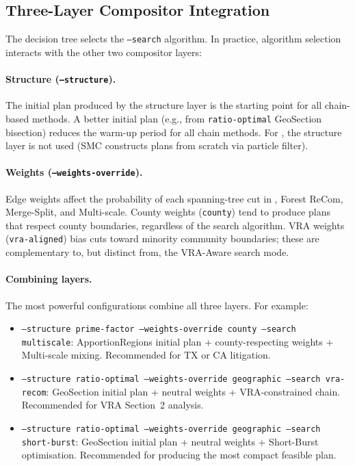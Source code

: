 \subsection{Three-Layer Compositor Integration}

The decision tree selects the \texttt{--search} algorithm.
In practice, algorithm selection interacts with the other two compositor
layers:

\paragraph{Structure (\texttt{--structure}).}
The initial plan produced by the structure layer is the starting point for
all chain-based methods.
A better initial plan (e.g., from \texttt{ratio-optimal} GeoSection
bisection) reduces the warm-up period for all chain methods.
For \smc{}, the structure layer is not used (SMC constructs plans from
scratch via particle filter).

\paragraph{Weights (\texttt{--weights-override}).}
Edge weights affect the probability of each spanning-tree cut in \recom{},
Forest ReCom, Merge-Split, and Multi-scale.
County weights (\texttt{county}) tend to produce plans that respect county
boundaries, regardless of the search algorithm.
VRA weights (\texttt{vra-aligned}) bias cuts toward minority community
boundaries; these are complementary to, but distinct from, the VRA-Aware
search mode.

\paragraph{Combining layers.}
The most powerful configurations combine all three layers.
For example:
\begin{itemize}
  \item \texttt{--structure prime-factor --weights-override county --search multiscale}:
        ApportionRegions initial plan + county-respecting weights +
        Multi-scale mixing.
        Recommended for TX or CA litigation.
  \item \texttt{--structure ratio-optimal --weights-override geographic --search vra-recom}:
        GeoSection initial plan + neutral weights + VRA-constrained chain.
        Recommended for VRA Section~2 analysis.
  \item \texttt{--structure ratio-optimal --weights-override geographic --search short-burst}:
        GeoSection initial plan + neutral weights + Short-Burst optimisation.
        Recommended for producing the most compact feasible plan.
\end{itemize}

